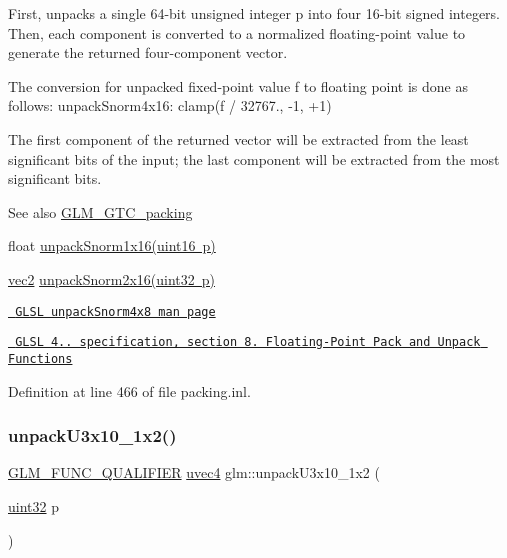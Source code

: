 First, unpacks a single 64-\/bit unsigned integer p into four 16-\/bit signed integers. Then, each component is converted to a normalized floating-\/point value to generate the returned four-\/component vector.

The conversion for unpacked fixed-\/point value f to floating point is done as follows\+: unpack\+Snorm4x16\+: clamp(f / 32767., -\/1, +1)

The first component of the returned vector will be extracted from the least significant bits of the input; the last component will be extracted from the most significant bits.

\begin{DoxySeeAlso}{See also}
\mbox{\hyperlink{group__gtc__packing}{G\+L\+M\+\_\+\+G\+T\+C\+\_\+packing}} 

float \mbox{\hyperlink{group__gtc__packing_ga246f451cebf590726324f7a283e3d65e}{unpack\+Snorm1x16(uint16 p)}} 

\mbox{\hyperlink{group__core__types_gaa1618f51db67eaa145db101d8c8431d8}{vec2}} \mbox{\hyperlink{group__core__func__packing_gae5f30f599243df9525315edecae09a7f}{unpack\+Snorm2x16(uint32 p)}} 

\href{http://www.opengl.org/sdk/docs/manglsl/xhtml/unpackSnorm2x16.xml}{\texttt{ G\+L\+SL unpack\+Snorm4x8 man page}} 

\href{http://www.opengl.org/registry/doc/GLSLangSpec.4.20.8.pdf}{\texttt{ G\+L\+SL 4.. specification, section 8. Floating-\/\+Point Pack and Unpack Functions}} 
\end{DoxySeeAlso}


Definition at line 466 of file packing.\+inl.

\mbox{\label{group__gtc__packing_ga119aa2d7d55952f9dc4214390a6ffefc}} 
\subsubsection{\texorpdfstring{unpackU3x10\_1x2()}{unpackU3x10\_1x2()}}
{\footnotesize\ttfamily \mbox{\hyperlink{setup_8hpp_a33fdea6f91c5f834105f7415e2a64407}{G\+L\+M\+\_\+\+F\+U\+N\+C\+\_\+\+Q\+U\+A\+L\+I\+F\+I\+ER}} \mbox{\hyperlink{group__core__types_ga1c426d19627b32b14f0089f7f4ba7b1d}{uvec4}} glm\+::unpack\+U3x10\+\_\+1x2 (\begin{DoxyParamCaption}\item[{\mbox{\hyperlink{group__gtc__type__precision_ga202b6a53c105fcb7e531f9b443518451}{uint32}}}]{p }\end{DoxyParamCaption})}

